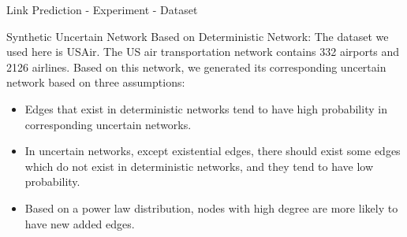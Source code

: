 \documentclass[9pt]{beamer}
\begin{document}
\begin{frame}{Link Prediction - Experiment - Dataset}


Synthetic Uncertain Network Based on Deterministic Network: The dataset we used here is USAir. The US air transportation network contains 332 airports and 2126 airlines. Based on this network, we generated its corresponding uncertain network based on three assumptions: 
\begin{itemize}
\item Edges that exist in deterministic networks tend to have high probability in corresponding uncertain networks.
\item In uncertain networks, except existential edges, there should exist some edges which do not exist in deterministic networks, and they tend to have low probability.
\item Based on a power law distribution, nodes with high degree are more likely to have new added edges.
\end{itemize}

\end{frame}
\end{document}
